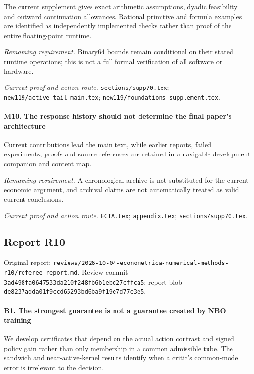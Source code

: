 The current supplement gives exact arithmetic assumptions, dyadic feasibility and outward continuation allowances. Rational primitive and formula examples are identified as independently implemented checks rather than proof of the entire floating-point runtime.

\par\emph{Remaining requirement.} Binary64 bounds remain conditional on their stated runtime operations; this is not a full formal verification of all software or hardware.

\par\emph{Current proof and action route.} \nolinkurl{sections/supp70.tex}; \nolinkurl{new119/active_tail_main.tex}; \nolinkurl{new119/foundations_supplement.tex}.

\paragraph{M10. The response history should not determine the final paper's architecture}

Current contributions lead the main text, while earlier reports, failed experiments, proofs and source references are retained in a navigable development companion and content map.

\par\emph{Remaining requirement.} A chronological archive is not substituted for the current economic argument, and archival claims are not automatically treated as valid current conclusions.

\par\emph{Current proof and action route.} \nolinkurl{ECTA.tex}; \nolinkurl{appendix.tex}; \nolinkurl{sections/supp70.tex}.

\subsection{Report R10}

Original report: \nolinkurl{reviews/2026-10-04-econometrica-numerical-methods-r10/referee_report.md}. Review commit \nolinkurl{3ad498fa0647533da210f248fb6b1ebd27cffca5}; report blob \nolinkurl{de8237adda01f9ccd65293bd6ba9f19e7d77e3e5}.

\paragraph{B1. The strongest guarantee is not a guarantee created by NBO training}

We develop certificates that depend on the actual action contrast and signed policy gain rather than only membership in a common admissible tube. The sandwich and near-active-kernel results identify when a critic's common-mode error is irrelevant to the decision.

